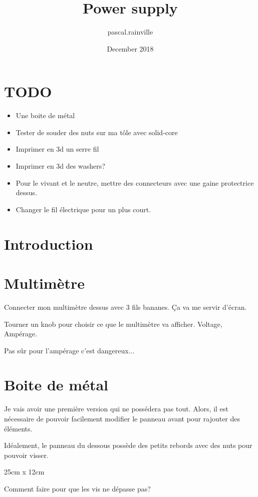 \documentclass{article}
\title{Power supply}
\author{pascal.rainville }
\date{December 2018}
\begin{document}
\maketitle

\section{TODO}


\begin{itemize}
    \item Une boite de métal
    \item Tester de souder des nuts sur ma tôle avec solid-core
    \item Imprimer en 3d un serre fil
    \item Imprimer en 3d des washers?
    \item Pour le vivant et le neutre, mettre des connecteurs avec une gaine protectrice dessus.
    \item Changer le fil électrique pour un plus court.
\end{itemize}

\section{Introduction}

\section{Multimètre}

Connecter mon multimètre dessus avec 3 fils bananes. Ça va me servir d'écran.

Tourner un knob pour choisir ce que le multimètre va afficher. Voltage, Ampérage.

Pas sûr pour l'ampérage c'est dangereux...

\section{Boite de métal}

Je vais avoir une première version qui ne possédera pas tout. Alors, il est nécessaire de pouvoir facilement modifier le panneau avant pour rajouter des éléments.

Idéalement, le panneau du dessous possède des petits rebords avec des nuts pour pouvoir visser.

25cm x 12cm

Comment faire pour que les vis ne dépasse pas?
\end{document}
